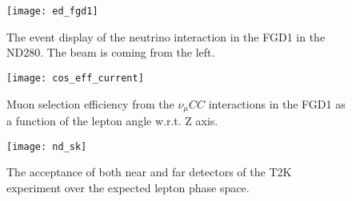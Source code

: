 \documentclass[../main.tex]{subfiles}
\begin{document}
\begin{figure}[!ht]
  \centering
  \begin{minipage}{0.49\linewidth}
      \begin{flushleft}
      \begin{minipage}{0.9\linewidth}
      \texttt{[image: ed\_fgd1]}
      \caption{The event display of the neutrino interaction in the FGD1 in the ND280. The beam is coming from the left.}
      \label{fig:up:ed_fgd1}
      \end{minipage}
      \begin{minipage}{0.1\linewidth}
      \end{minipage}
      \end{flushleft}
  \end{minipage}
  \begin{minipage}{0.49\linewidth}
      \begin{flushright}
      \begin{minipage}{0.1\linewidth}
      \end{minipage}
      \begin{minipage}{0.9\linewidth}
      \texttt{[image: cos\_eff\_current]}
      \caption{Muon selection efficiency from the $\nu_\mu CC$ interactions in the FGD1 as a function of the lepton angle w.r.t. Z axis.}
      \label{fig:up:cos_eff_current}
      \end{minipage}
      \end{flushright}
  \end{minipage}
\end{figure}

\begin{figure}[!ht]
  \centering
  \texttt{[image: nd\_sk]}
  \caption{The acceptance of both near and far detectors of the T2K experiment over the expected lepton phase space.}
  \label{fig:up:ps}
\end{figure}
\end{document}
